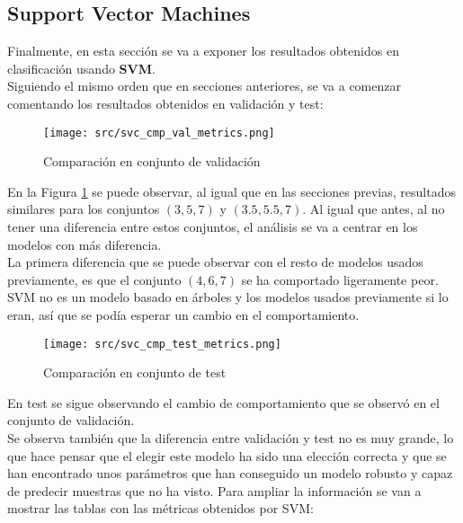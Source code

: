 \subsection{Support Vector Machines}
Finalmente, en esta sección se va a exponer los resultados obtenidos en clasificación usando \textbf{SVM}.\\
\linebreak
Siguiendo el mismo orden que en secciones anteriores, se va a comenzar comentando los resultados obtenidos en validación y test:
\begin{figure}[H]
	\centering
	\texttt{[image: src/svc\_cmp\_val\_metrics.png]}
	\caption{Comparación en conjunto de validación}
	\label{fig:svc_class_cmp_val}
\end{figure}
En la Figura \ref{fig:svc_class_cmp_val} se puede observar, al igual que en las secciones previas, resultados similares para los conjuntos $(3,5,7)$ y $(3.5,5.5,7)$. Al igual que antes, al no tener una diferencia entre estos conjuntos, el análisis se va a centrar en los modelos con más diferencia.\\
La primera diferencia que se puede observar con el resto de modelos usados previamente, es que el conjunto $(4,6,7)$ se ha comportado ligeramente peor. \\
SVM no es un modelo basado en árboles y los modelos usados previamente si lo eran, así que se podía esperar un cambio en el comportamiento.
\begin{figure}[H]
	\centering
	\texttt{[image: src/svc\_cmp\_test\_metrics.png]}
	\caption{Comparación en conjunto de test}
	\label{fig:svc_class_cmp_test}
\end{figure}
En test se sigue observando el cambio de comportamiento que se observó en el conjunto de validación.\\
\linebreak
Se observa también que la diferencia entre validación y test no es muy grande, lo que hace pensar que el elegir este modelo ha sido una elección correcta y que se han encontrado unos parámetros que han conseguido un modelo robusto y capaz de predecir muestras que no ha visto.
\clearpage
Para ampliar la información se van a mostrar las tablas con las métricas obtenidos por SVM:
